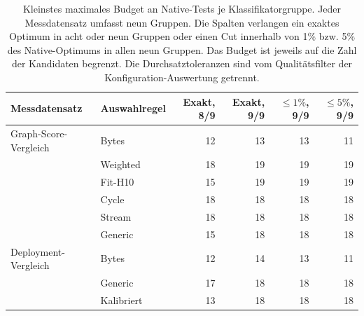 \begin{table}[t]
\centering\small
\caption{Kleinstes maximales Budget an Native-Tests je Klassifikatorgruppe. Jeder Messdatensatz umfasst neun Gruppen. Die Spalten verlangen ein exaktes Optimum in acht oder neun Gruppen oder einen Cut innerhalb von 1\% bzw. 5\% des Native-Optimums in allen neun Gruppen. Das Budget ist jeweils auf die Zahl der Kandidaten begrenzt. Die Durchsatztoleranzen sind vom Qualitätsfilter der Konfiguration-Auswertung getrennt.}
\label{tab:rq2-search-budgets}
\begin{tabular}{llrrrr}
\toprule
Messdatensatz & Auswahlregel & Exakt, 8/9 & Exakt, 9/9 & $\leq1\%$, 9/9 & $\leq5\%$, 9/9\\
\midrule
Graph-Score-Vergleich & Bytes & 12 & 13 & 13 & 11\\
 & Weighted & 18 & 19 & 19 & 19\\
 & Fit-H10 & 15 & 19 & 19 & 19\\
 & Cycle & 18 & 18 & 18 & 18\\
 & Stream & 18 & 18 & 18 & 18\\
 & Generic & 15 & 18 & 18 & 18\\
\midrule
Deployment-Vergleich & Bytes & 12 & 14 & 13 & 11\\
 & Generic & 17 & 18 & 18 & 18\\
 & Kalibriert & 13 & 18 & 18 & 18\\
\bottomrule
\end{tabular}
\end{table}
